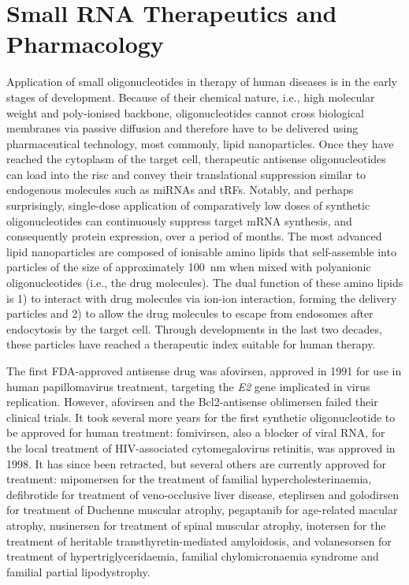 \section{Small RNA Therapeutics and Pharmacology} \label{sec:discussion:therapy}
Application of small oligonucleotides in therapy of human diseases is in the early stages of development. Because of their chemical nature, i.e., high molecular weight and poly-ionised backbone, oligonucleotides cannot cross biological membranes via passive diffusion and therefore have to be delivered using pharmaceutical technology, most commonly, lipid nanoparticles.\cite{Akhtar2007,Whitehead2009} Once they have reached the cytoplasm of the target cell, therapeutic antisense oligonucleotides can load into the \acf{risc} and convey their translational suppression similar to endogenous molecules such as miRNAs and tRFs. Notably, and perhaps surprisingly, single-dose application of comparatively low doses of synthetic oligonucleotides can continuously suppress target mRNA synthesis, and consequently protein expression, over a period of months.\cite{Raal2020} The most advanced lipid nanoparticles are composed of ionisable amino lipids that self-assemble into particles of the size of approximately \SI{100}{\nano\metre} when mixed with polyanionic oligonucleotides (i.e., the drug molecules).\cite{Akhtar2007} The dual function of these amino lipids is 1) to interact with drug molecules via ion-ion interaction, forming the delivery particles and 2) to allow the drug molecules to escape from endosomes after endocytosis by the target cell. Through developments in the last two decades, these particles have reached a therapeutic index suitable for human therapy.\cite{Jayaraman2012,Raal2020}

The first FDA-approved antisense drug was afovirsen, approved in 1991 for use in human papillomavirus treatment, targeting the \emph{E2} gene implicated in virus replication. However, afovirsen and the Bcl2-antisense oblimersen failed their clinical trials. It took several more years for the first synthetic oligonucleotide to be approved for human treatment: fomivirsen, also a blocker of viral RNA, for the local treatment of HIV-associated cytomegalovirus retinitis, was approved in 1998.\cite{Piascik1999} It has since been retracted, but several others are currently approved for treatment: mipomersen for the treatment of familial hypercholesterinaemia, defibrotide for treatment of veno-occlusive liver disease, eteplirsen and golodirsen for treatment of Duchenne muscular atrophy, pegaptanib for age-related macular atrophy, nusinersen for treatment of spinal muscular atrophy, inotersen for the treatment of heritable transthyretin-mediated amyloidosis, and volanesorsen for treatment of hypertriglyceridaemia, familial chylomicronaemia syndrome and familial partial lipodystrophy.\cite{Sharad2019,Wang2020} 


